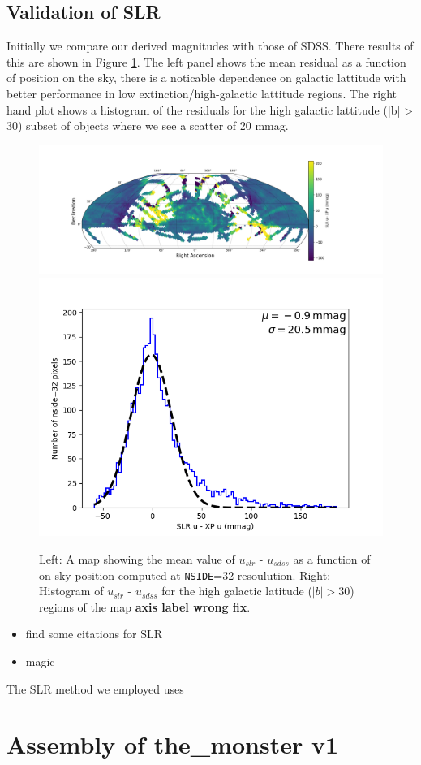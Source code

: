 \subsection{Validation of SLR}
Initially we compare our derived magnitudes with those of SDSS. There results of this are shown in Figure \ref{fig:slr_sdss_compare}. The left panel shows the mean residual as a function of position on the sky, there is a noticable dependence on galactic lattitude with better performance in low extinction/high-galactic lattitude regions. The right hand plot shows a histogram of the residuals for the high galactic lattitude (|b| > 30) subset of objects where we see a scatter of 20 mmag.  
\begin{figure}
    \includegraphics[width=0.64\linewidth]{./figures/u-band/uslr/uslr-usdss_full_map.png}
    \includegraphics[width=0.32\linewidth]{./figures/u-band/uslr/uslr-usdss_highglat_hist.png}

    \label{fig:slr_sdss_compare}
    \caption{
    Left: A map showing the mean value of $u_{slr}$ - $u_{sdss}$ as a function of on sky position computed at \texttt{NSIDE}=32 resoulution.  
    Right: Histogram of $u_{slr}$ - $u_{sdss}$ for the high galactic latitude ($|b| > 30$) regions of the map \textbf{axis label wrong fix}. }
\end{figure}



\begin{itemize}
    \item find some citations for SLR
    \item magic 
\end{itemize}
The SLR method we employed uses 

\section{Assembly of the\_monster v1}
\label{sec:assembly}

